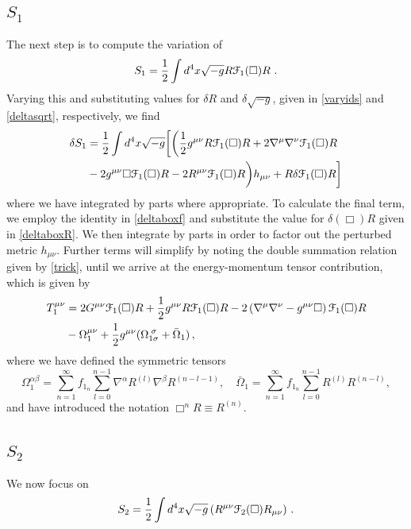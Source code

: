  \subsection{$S_1$}
 The next step is to compute the variation of
\begin{equation}
S_{1}=\frac{1}{2}\int d^{4}x\sqrt{-g}R{\cal F}_{1}(\Box)R\ .
\end{equation}
Varying this and substituting values for $\delta R$ and $\delta \sqrt{-g}$, given in \eqref{varyids} and \eqref{deltasqrt}, respectively, we
find 
\begin{align}
\delta S_{1}&=\frac{1}{2}\int d^{4}x\sqrt{-g}\biggl[\biggl(\frac{1}{2}g^{\mu\nu}R{\cal F}_{1}(\Box)R+2\nabla^{\mu}\nabla^{\nu}{\cal F}_{1}(\Box)R
\nonumber\\&
-2g^{\mu\nu}\square{\cal F}_{1}(\Box)R-2R^{\mu\nu}{\cal F}_{1}(\Box)R\biggr)h_{\mu\nu}+R\delta{\cal F}_{1}(\Box)R\biggr]
 \end{align}
where we have integrated by parts where appropriate. To calculate the final term, we employ the identity in \eqref{deltaboxf} and substitute the value for $\delta(\Box)R$ given in \eqref{deltaboxR}. We then integrate by parts in order to factor out the perturbed metric $h_{\mu\nu}$. Further terms will simplify by noting the double summation relation given by \eqref{trick}, until we arrive at the energy-momentum tensor contribution, which is given by
\begin{align}
T_{1}^{\mu\nu}&=2G^{\mu\nu}{\cal F}_{1}(\Box)R+\frac{1}{2}g^{\mu\nu}R{\cal F}_{1}(\Box)R-2\left(\nabla^{\mu}\nabla^{\nu}-g^{\mu\nu}\Box\right){\cal F}_{1}(\Box)R
\nonumber\\&
-\Omega_{1}^{\mu\nu}+\frac{1}{2}g^{\mu\nu}(\Omega_{1\sigma}^{\;\sigma}+\bar{\Omega}_{1})\,,
 \end{align}
where we have defined the symmetric tensors
\begin{equation}
\Omega_{1}^{\alpha\beta}=\sum_{n=1}^{\infty}f_{1_{n}}\sum_{l=0}^{n-1}\nabla^{
\alpha}R^{(l)}\nabla^{\beta}R^{(n-l-1)},\quad\bar{\Omega}_{1}=\sum_{n=1}^{\infty
}f_{1_{n}}\sum_{l=0}^{n-1}R^{(l)}R^{(n-l)},
\end{equation}
and have introduced the notation $\Box^n R\equiv R^{(n)}$.

\subsection{$S_2$}
We now focus on
\[
\label{s2}
S_{2}=\frac{1}{2}\int d^{4}x\sqrt{-g}\left(R^{\mu\nu}{\cal F}_{2}(\Box)R_{\mu\nu}\right)\,.
 \]


